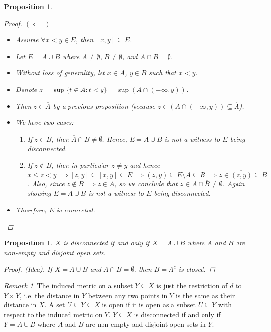 \documentclass[10pt]{article}
\newtheorem{proposition}[theorem]{Proposition}
\theoremstyle{definition}
\theoremstyle{remark}
\newtheorem*{remark}{Remark}
\begin{document}
\begin{proposition}
\begin{proof}
        $(\impliedby)$
        \begin{itemize}
            \item
        Assume $\forall x < y \in E$, then $[x, y] \subseteq E$.
            \item
        Let $E = A \cup B$ where $A \neq \emptyset$, $B \neq \emptyset$, and $A \cap B = \emptyset$.
            \item
        Without loss of generality, let $x \in A$, $y \in B$ such that $x < y$.
            \item
        Denote $z = \sup\{t \in A \colon t < y\} = \sup(A \cap (-\infty, y))$.
            \item
        Then $z \in \overline{A}$ by a previous proposition (because $z \in (A \cap (-\infty, y)) \subseteq \overline{A}$).
            \item
        We have two cases:
        \begin{enumerate}
            \item If $z \in B$, then $\overline{A} \cap B \neq \emptyset$. Hence, $E = A \cup B$ is not a witness to $E$ being disconnected.
            \item If $z \not\in B$, then in particular $z \neq y$ and hence $x \leq z < y \implies [z, y] \subseteq [x, y] \subseteq E \implies (z, y) \subseteq E \setminus A \subseteq B \implies z \in \overline{(z, y)} \subseteq \overline{B}$.
                Also, since $z \not\in B \implies z \in A$, so we conclude that $z \in A \cap \overline{B} \neq \emptyset$. Again showing $E = A \cup B$ is not a witness to $E$ being disconnected.
        \end{enumerate}
    \item 
        Therefore, $E$ is connected.
        \end{itemize}
    \end{proof}
\end{proposition}

\begin{proposition}
    $X$ is disconnected if and only if $X = A \cup B$ where $A$ and $B$ are non-empty and disjoint open sets.
    \begin{proof}
        (Idea). If $X = A \cup B$ and $A \cap \overline{B} = \emptyset$, then $\overline{B} = A^c$ is closed.
    \end{proof}
\end{proposition}

\begin{remark}
    The induced metric on a subset $Y \subseteq X$ is just the restriction of $d$ to $Y \times Y$, i.e. the distance in $Y$ between any two points in $Y$ is the same as their distance in $X$.
    A set $U \subseteq Y \subseteq X$ is open if it is open as a subset $U \subseteq Y$ with respect to the induced metric on $Y$.
    $Y \subseteq X$ is disconnected if and only if $Y = A \cup B$ where $A$ and $B$ are non-empty and disjoint open sets in $Y$.
\end{remark}
\end{document}
